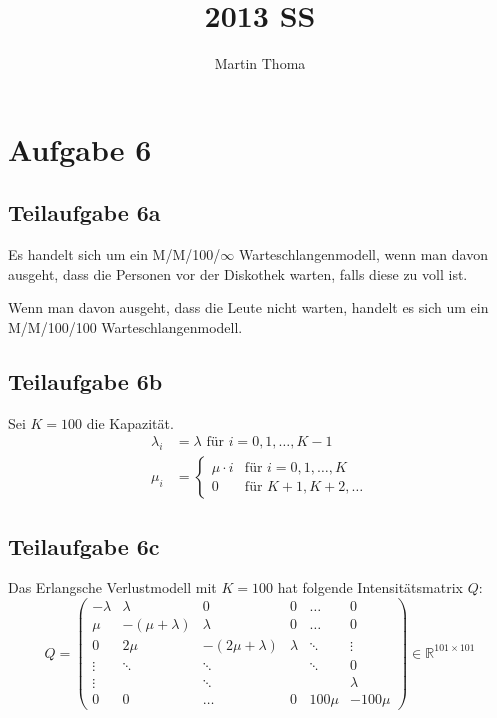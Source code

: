 \documentclass[a4paper]{scrartcl}
\begin{document}
 \title{2013 SS}
 \author{Martin Thoma}

 \setcounter{section}{1}
 \section*{Aufgabe 6}
 \subsection*{Teilaufgabe 6a}
Es handelt sich um ein M/M/100/$\infty$ Warteschlangenmodell, wenn man davon
ausgeht, dass die Personen vor der Diskothek warten, falls diese zu voll ist.

Wenn man davon ausgeht, dass die Leute nicht warten, handelt es sich um ein
M/M/100/100 Warteschlangenmodell.

\subsection*{Teilaufgabe 6b}
Sei $K=100$ die Kapazität.
\begin{align}
    \lambda_i &= \lambda \text{ für } i=0, 1, \dots, K-1\\
    \mu_i     &= \begin{cases}\mu \cdot i &\text{für } i=0, 1, \dots, K\\
                              0           &\text{für } K+1, K+2, \dots \end{cases}
\end{align}

\subsection*{Teilaufgabe 6c}
Das Erlangsche Verlustmodell mit $K=100$ hat folgende Intensitätsmatrix $Q$:
\[Q = \begin{pmatrix}
- \lambda &        \lambda &               0 & 0       & \dots   & 0\\
      \mu & -(\mu+\lambda) &         \lambda & 0       & \dots   & 0\\
        0 &          2 \mu & -(2\mu+\lambda) & \lambda & \ddots  & \vdots\\
   \vdots &  \ddots        &          \ddots &         & \ddots  & 0\\
   \vdots &                &          \ddots &         &         & \lambda\\
        0 &              0 &           \dots & 0       & 100 \mu & -100\mu
\end{pmatrix} \in \mathbb{R}^{101 \times 101}\]
\end{document}
